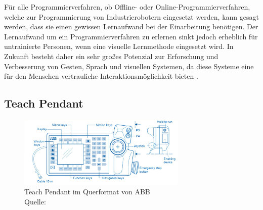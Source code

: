 Für alle Programmierverfahren, ob Offline- oder Online-Programmierverfahren, welche zur Programmierung von Industrierobotern eingesetzt werden, kann gesagt werden, dass sie einen gewissen Lernaufwand bei der Einarbeitung benötigen. Der Lernaufwand um ein Programmierverfahren zu erlernen sinkt jedoch erheblich für untrainierte Personen, wenn eine visuelle Lernmethode eingesetzt wird. In Zukunft besteht daher ein sehr großes Potenzial zur Erforschung und Verbesserung von Gesten, Sprach und visuellen Systemen, da diese Systeme eine für den Menschen vertrauliche Interaktionsmöglichkeit bieten \cite{biggs_survey_nodate}.\clearpage

\subsection{Teach Pendant}
\begin{figure}[htb]
	\centering
	\includegraphics[width=0.715\textwidth]{images/stand_der_technik/teach_pendant}
	\caption[Teach Pendant im Querformat von ABB]{Teach Pendant im Querformat von ABB \\Quelle: \cite{programengif_nodate}}
	\label{fig:teach_pendant}
\end{figure}
\FloatBarrier

